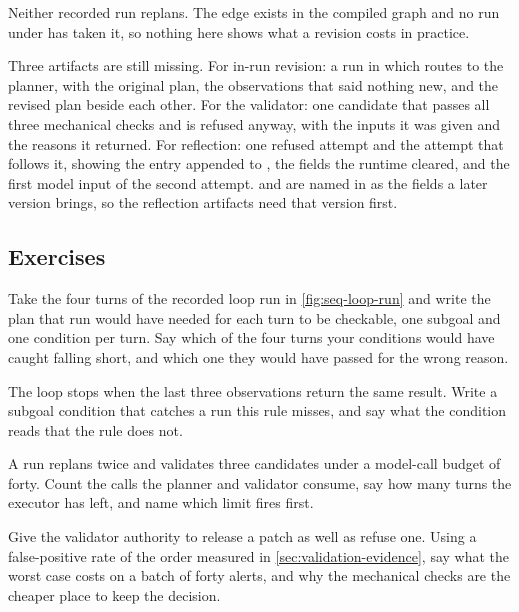 Neither recorded run replans. The edge exists in the compiled graph and no run under
 has taken it, so nothing here shows what a revision costs in practice.

\begin{demostub}
Three artifacts are still missing. For in-run revision: a run in which  routes
to the planner, with the original plan, the observations that said nothing new, and the revised plan
beside each other. For the validator: one candidate that passes all three mechanical checks and is
refused anyway, with the inputs it was given and the reasons it returned. For reflection: one
refused attempt and the attempt that follows it, showing the entry appended to
, the fields the runtime cleared, and the first model input of the second
attempt.  and  are named in  as the fields a
later version brings, so the reflection artifacts need that version first.
\end{demostub}

\subsection{Exercises}

\be

\item Take the four turns of the recorded loop run in \cref{fig:seq-loop-run} and write the plan
that run would have needed for each turn to be checkable, one subgoal and one condition per turn.
Say which of the four turns your conditions would have caught falling short, and which one they
would have passed for the wrong reason.

\item The loop stops when the last three observations return the same result. Write a subgoal
condition that catches a run this rule misses, and say what the condition reads that the rule does
not.

\item A run replans twice and validates three candidates under a model-call budget of forty. Count
the calls the planner and validator consume, say how many turns the executor has left, and name
which limit fires first.

\item Give the validator authority to release a patch as well as refuse one. Using a false-positive
rate of the order measured in \cref{sec:validation-evidence}, say what the worst case costs on a
batch of forty alerts, and why the mechanical checks are the cheaper place to keep the decision.

